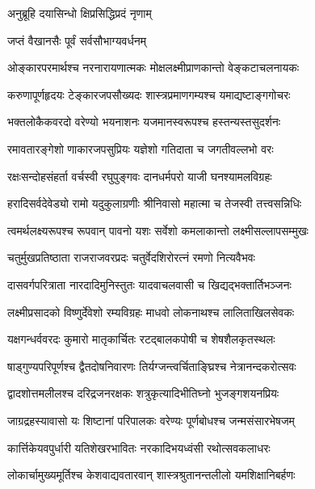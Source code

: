 

{अनुब्रूहि  दयासिन्धो  क्षिप्रसिद्धिप्रदं  नृणाम्}

{जप्तं  वैखानसैः  पूर्वं  सर्वसौभाग्यवर्धनम्}

\twolineshloka
{ओङ्कारपरमार्थश्च  नरनारायणात्मकः}
{मोक्षलक्ष्मीप्राणकान्तो वेङ्कटाचलनायकः}

\twolineshloka
{करुणापूर्णहृदयः टेङ्कारजपसौख्यदः}
{शास्त्रप्रमाणगम्यश्च यमाद्यष्टाङ्गगोचरः}

\twolineshloka
{भक्तलोकैकवरदो वरेण्यो भयनाशनः}
{यजमानस्वरूपश्च हस्तन्यस्तसुदर्शनः}

\twolineshloka
{रमावतारङ्गेशो णाकारजपसुप्रियः}
{यज्ञेशो गतिदाता च जगतीवल्लभो वरः}

\twolineshloka
{रक्षःसन्दोहसंहर्ता वर्चस्वी रघुपुङ्गवः}
{दानधर्मपरो याजी घनश्यामलविग्रहः}

\twolineshloka
{हरादिसर्वदेवेड्यो रामो यदुकुलाग्रणीः}
{श्रीनिवासो महात्मा च तेजस्वी तत्त्वसन्निधिः}

\twolineshloka
{त्वमर्थलक्ष्यरूपश्च रूपवान् पावनो यशः}
{सर्वेशो कमलाकान्तो लक्ष्मीसल्लापसम्मुखः}

\twolineshloka
{चतुर्मुखप्रतिष्ठाता राजराजवरप्रदः}
{चतुर्वेदशिरोरत्नं रमणो नित्यवैभवः}

\twolineshloka
{दासवर्गपरित्राता नारदादिमुनिस्तुतः}
{यादवाचलवासी च खिद्यद्भक्तार्तिभञ्जनः}

\twolineshloka
{लक्ष्मीप्रसादको विष्णुर्देवेशो रम्यविग्रहः}
{माधवो लोकनाथश्च लालिताखिलसेवकः}

\twolineshloka
{यक्षगन्धर्ववरदः कुमारो मातृकार्चितः}
{रटद्बालकपोषी च शेषशैलकृतस्थलः}

\twolineshloka
{षाड्गुण्यपरिपूर्णश्च द्वैतदोषनिवारणः}
{तिर्यग्जन्त्वर्चिताङ्घ्रिश्च नेत्रानन्दकरोत्सवः}

\twolineshloka
{द्वादशोत्तमलीलश्च दरिद्रजनरक्षकः}
{शत्रुकृत्यादिभीतिघ्नो भुजङ्गशयनप्रियः}

\twolineshloka
{जाग्रद्रहस्यावासो यः शिष्टानां  परिपालकः}
{वरेण्यः पूर्णबोधश्च जन्मसंसारभेषजम्}

\twolineshloka
{कार्त्तिकेयवपुर्धारी यतिशेखरभावितः}
{नरकादिभयध्वंसी रथोत्सवकलाधरः}

\twolineshloka
{लोकार्चामुख्यमूर्तिश्च केशवाद्यवतारवान्}
{शास्त्रश्रुतानन्तलीलो यमशिक्षानिबर्हणः}


